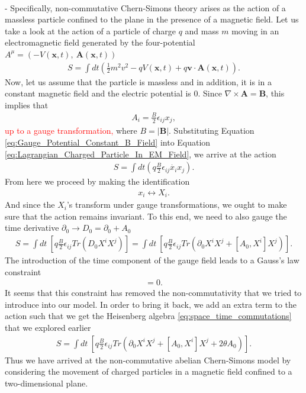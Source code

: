     \\ 
    - Specifically, non-commutative Chern-Simons theory arises as the action of a massless particle confined to the plane in the presence of a magnetic field. \cite{Polychronakos:2001mi} Let us take a look at the action of a particle of charge $q$ and mass $m$ moving in an electromagnetic field generated by the four-potential $A^{\mu} = \left(-V(\bm{x}, t), \ \bm{A}(\bm{x},t)\right)$
    \begin{align}
        S = \int dt \left(\frac{1}{2} m^2 v^2 - q V(\bm{x},t) + q \bm{v} \cdot \bm{A}(\bm{x},t)\right). \label{eq:Lagrangian_Charged_Particle_In_EM_Field}
    \end{align}
    Now, let us assume that the particle is massless and in addition, it is in a constant magnetic field and the electric potential is 0. Since $\nabla \times \bm{A} = \bm{B}$, this implies that
    \begin{align}
        A_i = \frac{B}{2} \epsilon_{i j} x_j \label{eq:Gauge_Potential_Constant_B_Field},
    \end{align}
    \textcolor{red}{up to a gauge transformation,} where $B= |\bm{B}|$.
    Substituting Equation \eqref{eq:Gauge_Potential_Constant_B_Field}  into Equation \eqref{eq:Lagrangian_Charged_Particle_In_EM_Field}, we arrive at the action
    \begin{align}
        S = \int dt \left( q \frac{B}{2}\epsilon_{i j} \dot{x_i} x_j \right).
    \end{align}
    From here we proceed by making the identification
    \begin{align}
        x_i \leftrightarrow X_i.
    \end{align}
    And since the $X_i$'s transform under gauge transformations, we ought to make sure that the action remains invariant. To this end, we need to also gauge the time derivative $\partial_0 \rightarrow D_0 = \partial_0 +A_0$
    \begin{align}
        S = \int dt \ \left[ q \frac{B}{2} \epsilon_{ij} Tr \left(D_0 X^i X^j \right) \right] = \int dt \ \left[ q \frac{B}{2} \epsilon_{ij} Tr \left(\partial_0 X^i X^j + [A_0, X^i] X^j \right) \right].
    \end{align}
    The introduction of the time component of the gauge field leads to a Gauss's law constraint
    \begin{align}
        [X^1, X^2] =0.
    \end{align}
    It seems that this constraint has removed the non-commutativity that we tried to introduce into our model. In order to bring it back, we add an extra term to the action such that we get the Heisenberg algebra \eqref{eq:space_time_commutations} that we explored earlier
    \begin{align}
        S =\int dt \ \left[ q \frac{B}{2} \epsilon_{ij} Tr \left(\partial_0 X^i X^j + [A_0, X^i] X^j + 2 \theta A_0 \right) \right].
    \end{align}
    Thus we have arrived at the non-commutative abelian Chern-Simons model by considering the movement of charged particles in a magnetic field confined to a two-dimensional plane.

    

